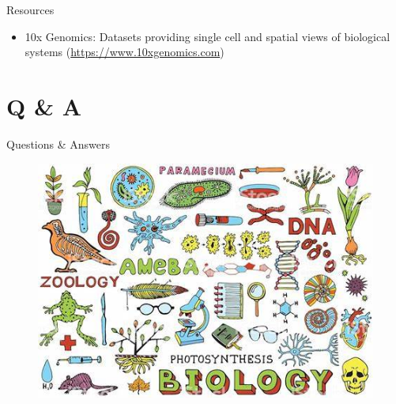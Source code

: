 \documentclass[handout,t]{beamer}
\begin{document}
\begin{frame}{Resources}
\begin{itemize}
\item 10x Genomics: Datasets providing single cell and spatial views of biological systems (\url{https://www.10xgenomics.com})
\end{itemize}
\end{frame}



\section{Q \& A}
\begin{frame}{Questions \& Answers}
\vspace{-0.3cm}
\begin{figure}
\includegraphics[width=0.85\columnwidth]{th.jpeg}
\end{figure}
\end{frame}
\end{document}
